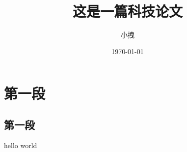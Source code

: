 \documentclass{article}
\title{这是一篇科技论文}
\date{\today}
\author{小拽}
\begin{document}
\maketitle
\section{第一段}
\subsection{第一段}
hello world
\end{document}

